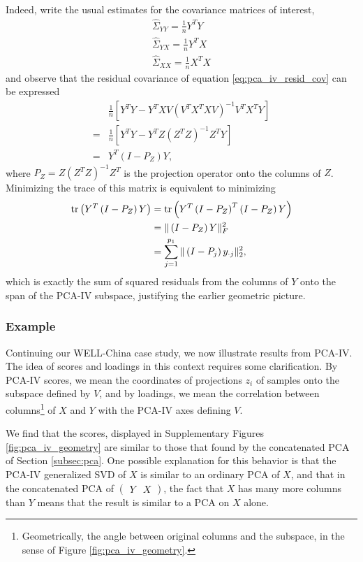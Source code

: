 \documentclass[14pt]{extarticle}
\begin{document}
Indeed, write the usual estimates for the covariance matrices of interest,
\begin{align*}
  \hat{\Sigma}_{YY} = \frac{1}{n}Y^{T}Y \\
  \hat{\Sigma}_{YX} = \frac{1}{n}Y^{T}X \\
  \hat{\Sigma}_{XX} = \frac{1}{n}X^{T}X
\end{align*}
and observe that the residual covariance of equation \ref{eq:pca_iv_resid_cov}
can be expressed
\begin{align*}
  &\frac{1}{n}\left[Y^{T}Y -
    Y^{T}XV\left(V^{T}X^{T}XV\right)^{-1}V^{T}X^{T}Y\right] \\
  = &\frac{1}{n}\left[Y^{T}Y - Y^{T}Z\left(Z^{T}Z\right)^{-1}Z^{T}Y\right] \\
  = &Y^T \left(I - P_{Z}\right)Y,
\end{align*}
where $P_{Z} = Z\left(Z^{T}Z\right)^{-1}Z^{T}$ is the projection operator onto
the columns of $Z$. Minimizing the trace of this matrix is equivalent to
minimizing
\begin{align*}
  \mathop\mathrm{tr}\left(Y^{T}\left(I - P_{Z}\right)Y\right) &=
  \mathop\mathrm{tr}\left(Y^{T}\left(I - P_{Z}\right)^{T}\left(I -
      P_{Z}\right)Y\right) \\
  &= \|\left(I - P_{Z}\right)Y\|_{F}^{2} \\
  &= \sum_{j = 1}^{p_{1}}\|\left(I - P_{j}\right)y_{\cdot j}\|^{2}_{2},
\end{align*}
which is exactly the sum of squared residuals from the columns of $Y$ onto the
span of the PCA-IV subspace, justifying the earlier geometric picture.

\subsubsection{Example}
\label{subsec:pcaiv_example}

Continuing our WELL-China case study, we now illustrate results from PCA-IV. The
idea of scores and loadings in this context requires some clarification. By
PCA-IV scores, we mean the coordinates of projections $z_{i}$ of samples onto
the subspace defined by $V$, and by loadings, we mean the correlation between
columns\footnote{Geometrically, the angle between original columns and the
  subspace, in the sense of Figure \ref{fig:pca_iv_geometry}.} of $X$ and $Y$
with the PCA-IV axes defining $V$.

We find that the scores, displayed in Supplementary Figures
\ref{fig:pca_iv_geometry} are similar to those that found by the concatenated
PCA of Section \ref{subsec:pca}. One possible explanation for this behavior is
that the PCA-IV generalized SVD of $X$ is similar to an ordinary PCA of $X$, and
that in the concatenated PCA of $\begin{pmatrix}Y & X\end{pmatrix}$, the fact
  that $X$ has many more columns than $Y$ means that the result is similar to a
  PCA on $X$ alone.
\end{document}
